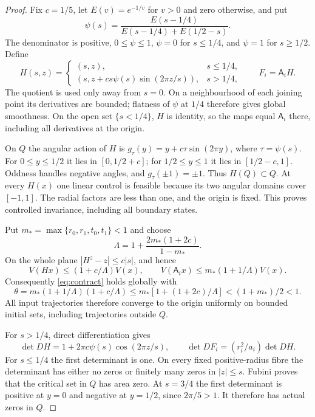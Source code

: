 \documentclass[11pt]{amsart}
\theoremstyle{definition}
\theoremstyle{remark}
\numberwithin{equation}{section}
\begin{document}
\begin{proof}
Fix $c=1/5$, let $E(v)=e^{-1/v}$ for $v>0$ and zero otherwise,
and put
\[
\psi(s)=\frac{E(s-1/4)}{E(s-1/4)+E(1/2-s)}.
\]
The denominator is positive, $0\le\psi\le1$,
$\psi=0$ for $s\le1/4$, and $\psi=1$ for $s\ge1/2$.
Define
\begin{equation}\label{eq:fold}
H(s,z)=
\begin{cases}
(s,z),&s\le1/4,\\
(s,z+cs\psi(s)\sin(2\pi z/s)),&s>1/4,
\end{cases}
\qquad F_i=\mathsf A_iH.
\end{equation}
The quotient is used only away from $s=0$. On a neighbourhood
of each joining point its derivatives are bounded; flatness of
$\psi$ at $1/4$ therefore gives global smoothness. On the open
set $\{s<1/4\}$, $H$ is identity, so the maps equal
$\mathsf A_i$ there, including all derivatives at the origin.

On $Q$ the angular action of $H$ is
$g_\tau(y)=y+c\tau\sin(2\pi y)$, where $\tau=\psi(s)$.
For $0\le y\le1/2$ it lies in $[0,1/2+c]$;
for $1/2\le y\le1$ it lies in $[1/2-c,1]$.
Oddness handles negative angles, and $g_\tau(\pm1)=\pm1$.
Thus $H(Q)\subset Q$. At every $H(x)$ one linear control
is feasible because its two angular domains cover $[-1,1]$.
The radial factors are less than one, and the origin is fixed.
This proves controlled invariance, including all boundary states.

Put $m_* =\max\{r_0,r_1,t_0,t_1\}<1$ and choose
\[
\Lambda=1+\frac{2m_*(1+2c)}{1-m_*}.
\]
On the whole plane $|H^z-z|\le c|s|$, and hence
\[
V(Hx)\le(1+c/\Lambda)V(x),\qquad
V(\mathsf A_i x)\le m_*(1+1/\Lambda)V(x).
\]
Consequently \eqref{eq:contract} holds globally with
\[
\theta=m_*(1+1/\Lambda)(1+c/\Lambda)
 \le m_*[1+(1+2c)/\Lambda]<(1+m_*)/2<1.
\]
All input trajectories therefore converge to the origin uniformly
on bounded initial sets, including trajectories outside $Q$.

For $s>1/4$, direct differentiation gives
\begin{equation}\label{eq:foldcritical}
\det DH=1+2\pi c\psi(s)\cos(2\pi z/s),\qquad
\det DF_i=(r_i^2/a_i)\det DH.
\end{equation}
For $s\le1/4$ the first determinant is one. On every fixed
positive-radius fibre the determinant has either no zeros or finitely
many zeros in $|z|\le s$. Fubini proves that the critical set
in $Q$ has area zero. At $s=3/4$ the first determinant is positive
at $y=0$ and negative at $y=1/2$, since $2\pi/5>1$.
It therefore has actual zeros in $Q$.


\end{proof}
\end{document}
